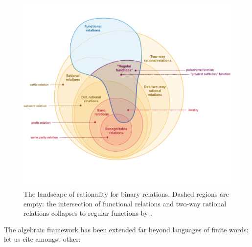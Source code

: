 \begin{figure}[htb]
	\centering
	\includegraphics[width=\linewidth]{fig/algebra/landscape.png}
	\caption{
		\label{fig:landscape-rationality} The landscape of rationality for binary relations.
		Dashed regions are empty: the intersection of
		functional relations and two-way rational relations
		collapses to regular functions by
		\cite[Theorem 22, p.~243]{EH2001transduction}.
	}
\end{figure}
The algebraic framework has been extended far beyond languages of finite words: let us cite amongst other:
